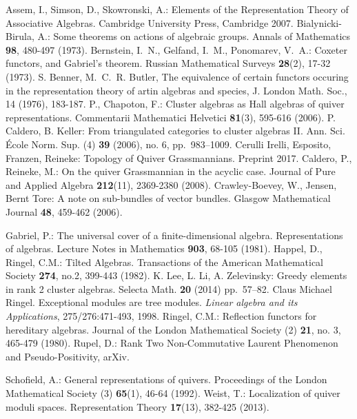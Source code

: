 \documentclass{amsart}
\begin{document}
\begin{thebibliography}{10}
Assem, I., Simson, D., Skowronski, A.: Elements of the Representation Theory of Associative Algebras. Cambridge University Press, Cambridge 2007.
 Bialynicki-Birula, A.: Some theorems on actions of algebraic groups. Annals of Mathematics \textbf{98}, 480-497 (1973).
Bernstein, I.~N., Gelfand, I.~M., Ponomarev, V.~A.: Coxeter functors, and Gabriel's theorem. Russian Mathematical Surveys \textbf{28}(2), 17-32 (1973).
 S. Benner, M.~C.~R. Butler, The equivalence of certain functors occuring in the representation theory of artin algebras and species, J. London Math. Soc., 14 (1976), 183-187.
 P., Chapoton, F.: Cluster algebras as {H}all algebras of quiver representations.
Commentarii Mathematici Helvetici \textbf{81}(3), 595-616 (2006).
  P. Caldero, B. Keller: From triangulated categories to cluster algebras II.  Ann. Sci. \'Ecole Norm. Sup. (4) \textbf{39} (2006), no. 6, pp.~983--1009.
 Cerulli Irelli, Esposito, Franzen, Reineke: Topology of Quiver Grassmannians. Preprint 2017.
Caldero, P., Reineke, M.: On the quiver Grassmannian in the acyclic case.
Journal of Pure and Applied Algebra \textbf{212}(11), 2369-2380 (2008).
 Crawley-Boevey, W., Jensen, Bernt Tore: A note on sub-bundles of vector bundles. Glasgow Mathematical Journal \textbf{48}, 459-462 (2006).

 Gabriel, P.: The universal cover of a finite-dimensional algebra. Representations of algebras. Lecture Notes in Mathematics {\bf 903}, 68-105 (1981).
 Happel, D., Ringel, C.M.: Tilted Algebras. Transactions of the American Mathematical Society {\bf 274}, no.2, 399-443 (1982).
 K. Lee, L. Li, A. Zelevinsky: Greedy elements in rank 2 cluster algebras. Selecta Math. \textbf{20} (2014) pp.~57--82.
 Claus Michael Ringel. Exceptional modules are tree modules. \textit{Linear algebra and its Applications}, 275/276:471-493, 1998.
 Ringel, C.M.: Reflection functors for hereditary algebras. Journal of the London Mathematical Society (2) {\bf 21}, no. 3, 465-479 (1980).
 Rupel, D.: Rank Two Non-Commutative Laurent Phenomenon and Pseudo-Positivity, arXiv.

 Schofield, A.: General representations of quivers. Proceedings of the London Mathematical Society (3) \textbf{65}(1), 46-64 (1992).
	 Weist, T.: Localization of quiver moduli spaces. Representation Theory \textbf{17}(13), 382-425 (2013).
\end{thebibliography}
\end{document}
